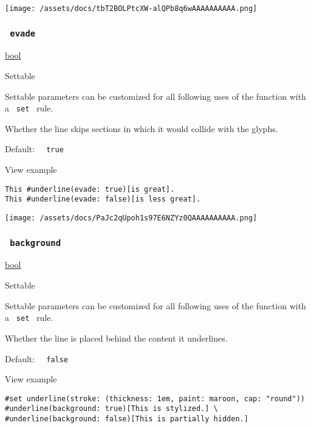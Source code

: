 \texttt{[image: /assets/docs/tbT2BOLPtcXW-alQPb8q6wAAAAAAAAAA.png]}

\subsubsection{\texorpdfstring{\texttt{\ evade\ }}{ evade }}\label{parameters-evade}

\href{/docs/reference/foundations/bool/}{bool}

{{ Settable }}

\label{parameters-evade-settable-tooltip}
Settable parameters can be customized for all following uses of the
function with a \texttt{\ set\ } rule.

Whether the line skips sections in which it would collide with the
glyphs.

Default: \texttt{\ }{\texttt{\ true\ }}\texttt{\ }


View example

\begin{verbatim}
This #underline(evade: true)[is great].
This #underline(evade: false)[is less great].
\end{verbatim}

\texttt{[image: /assets/docs/PaJc2qUpoh1s97E6NZYz0QAAAAAAAAAA.png]}

\subsubsection{\texorpdfstring{\texttt{\ background\ }}{ background }}\label{parameters-background}

\href{/docs/reference/foundations/bool/}{bool}

{{ Settable }}

\label{parameters-background-settable-tooltip}
Settable parameters can be customized for all following uses of the
function with a \texttt{\ set\ } rule.

Whether the line is placed behind the content it underlines.

Default: \texttt{\ }{\texttt{\ false\ }}\texttt{\ }


View example

\begin{verbatim}
#set underline(stroke: (thickness: 1em, paint: maroon, cap: "round"))
#underline(background: true)[This is stylized.] \
#underline(background: false)[This is partially hidden.]
\end{verbatim}


